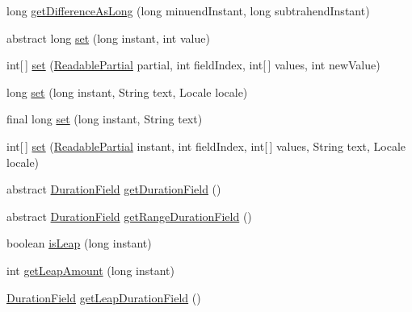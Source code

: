 \begin{DoxyCompactItemize}
\item 
long \hyperlink{classorg_1_1joda_1_1time_1_1field_1_1_base_date_time_field_a9e94d93aa8379eef0cfc5887fbef05db}{get\-Difference\-As\-Long} (long minuend\-Instant, long subtrahend\-Instant)
\item 
abstract long \hyperlink{classorg_1_1joda_1_1time_1_1field_1_1_base_date_time_field_ace20661fb97d7f15a921bcc8999aa1fc}{set} (long instant, int value)
\item 
int\mbox{[}$\,$\mbox{]} \hyperlink{classorg_1_1joda_1_1time_1_1field_1_1_base_date_time_field_a2979fede138cfa6ce21d736d0adccbb5}{set} (\hyperlink{interfaceorg_1_1joda_1_1time_1_1_readable_partial}{Readable\-Partial} partial, int field\-Index, int\mbox{[}$\,$\mbox{]} values, int new\-Value)
\item 
long \hyperlink{classorg_1_1joda_1_1time_1_1field_1_1_base_date_time_field_a0c3c2359fa029ceed53f827c6cf7ec97}{set} (long instant, String text, Locale locale)
\item 
final long \hyperlink{classorg_1_1joda_1_1time_1_1field_1_1_base_date_time_field_aada9c6166914e5423d7fe18343b47b4e}{set} (long instant, String text)
\item 
int\mbox{[}$\,$\mbox{]} \hyperlink{classorg_1_1joda_1_1time_1_1field_1_1_base_date_time_field_a32f4f621ad7cdfd00d52ddbd4aa75e99}{set} (\hyperlink{interfaceorg_1_1joda_1_1time_1_1_readable_partial}{Readable\-Partial} instant, int field\-Index, int\mbox{[}$\,$\mbox{]} values, String text, Locale locale)
\item 
abstract \hyperlink{classorg_1_1joda_1_1time_1_1_duration_field}{Duration\-Field} \hyperlink{classorg_1_1joda_1_1time_1_1field_1_1_base_date_time_field_aa7354981ac68fbceeef46a348e6797b0}{get\-Duration\-Field} ()
\item 
abstract \hyperlink{classorg_1_1joda_1_1time_1_1_duration_field}{Duration\-Field} \hyperlink{classorg_1_1joda_1_1time_1_1field_1_1_base_date_time_field_a915525b6aa6fe15d6cedf91e530bc836}{get\-Range\-Duration\-Field} ()
\item 
boolean \hyperlink{classorg_1_1joda_1_1time_1_1field_1_1_base_date_time_field_a04d1090a4047552a242b34260a50f3f7}{is\-Leap} (long instant)
\item 
int \hyperlink{classorg_1_1joda_1_1time_1_1field_1_1_base_date_time_field_a222d6325874d5411bc9bb40067e32f0d}{get\-Leap\-Amount} (long instant)
\item 
\hyperlink{classorg_1_1joda_1_1time_1_1_duration_field}{Duration\-Field} \hyperlink{classorg_1_1joda_1_1time_1_1field_1_1_base_date_time_field_af9879f6bff6e3cfe087041258354d825}{get\-Leap\-Duration\-Field} ()

\end{DoxyCompactItemize}
